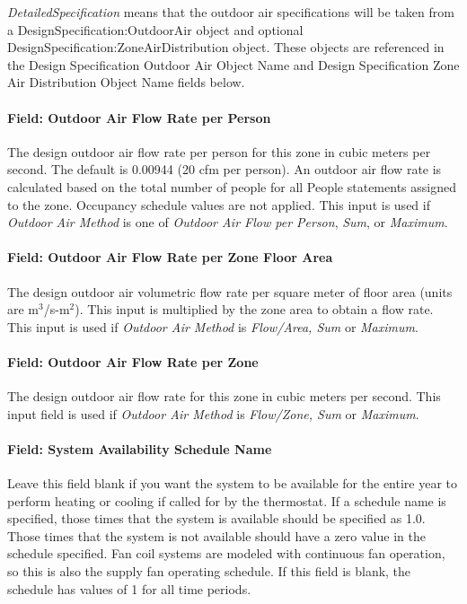 \emph{DetailedSpecification} means that the outdoor air specifications will be taken from a DesignSpecification:OutdoorAir object and optional DesignSpecification:ZoneAirDistribution object. These objects are referenced in the Design Specification Outdoor Air Object Name and Design Specification Zone Air Distribution Object Name fields below.

\paragraph{Field: Outdoor Air Flow Rate per Person}\label{field-outdoor-air-flow-rate-per-person-2}

The design outdoor air flow rate per person for this zone in cubic meters per second. The default is 0.00944 (20 cfm per person). An outdoor air flow rate is calculated based on the total number of people for all People statements assigned to the zone. Occupancy schedule values are not applied. This input is used if \emph{Outdoor Air Method} is one of \emph{Outdoor Air Flow per Person}, \emph{Sum}, or \emph{Maximum}.

\paragraph{Field: Outdoor Air Flow Rate per Zone Floor Area}\label{field-outdoor-air-flow-rate-per-zone-floor-area-2}

The design outdoor air volumetric flow rate per square meter of floor area (units are m\(^{3}\)/s-m\(^{2}\)). This input is multiplied by the zone area to obtain a flow rate. This input is used if \emph{Outdoor Air Method} is \emph{Flow/Area, Sum} or \emph{Maximum}.

\paragraph{Field: Outdoor Air Flow Rate per Zone}\label{field-outdoor-air-flow-rate-per-zone-2}

The design outdoor air flow rate for this zone in cubic meters per second. This input field is used if \emph{Outdoor Air Method} is \emph{Flow/Zone, Sum} or \emph{Maximum}.

\paragraph{Field: System Availability Schedule Name}\label{field-system-availability-schedule-name-1}

Leave this field blank if you want the system to be available for the entire year to perform heating or cooling if called for by the thermostat. If a schedule name is specified, those times that the system is available should be specified as 1.0. Those times that the system is not available should have a zero value in the schedule specified. Fan coil systems are modeled with continuous fan operation, so this is also the supply fan operating schedule. If this field is blank, the schedule has values of 1 for all time periods.

